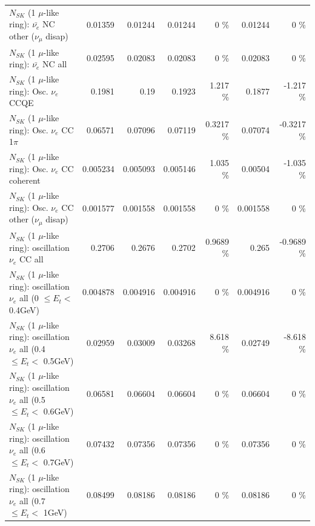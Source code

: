 \begin{table}
\begin{tabular}{| l | r | r | r  r | r  r |}
          $N_{SK}$ (1 $\mu$-like ring): $\bar{\nu_e}$ NC other ($\nu_\mu$ disap) &         0.01359 &         0.01244 &         0.01244 &        0 \%  &         0.01244 &        0 \%  \\ 
                            $N_{SK}$ (1 $\mu$-like ring): $\bar{\nu_{e}}$ NC all &         0.02595 &         0.02083 &         0.02083 &        0 \%  &         0.02083 &        0 \%  \\ 
\hline
\hline
\hline
                                 $N_{SK}$ (1 $\mu$-like ring): Osc. $\nu_e$ CCQE &          0.1981 &            0.19 &          0.1923 &    1.217 \%  &          0.1877 &   -1.217 \%  \\ 
                            $N_{SK}$ (1 $\mu$-like ring): Osc. $\nu_e$ CC 1$\pi$ &         0.06571 &         0.07096 &         0.07119 &   0.3217 \%  &         0.07074 &  -0.3217 \%  \\ 
                          $N_{SK}$ (1 $\mu$-like ring): Osc. $\nu_e$ CC coherent &        0.005234 &        0.005093 &        0.005146 &    1.035 \%  &         0.00504 &   -1.035 \%  \\ 
           $N_{SK}$ (1 $\mu$-like ring): Osc. $\nu_e$ CC other ($\nu_\mu$ disap) &        0.001577 &        0.001558 &        0.001558 &        0 \%  &        0.001558 &        0 \%  \\ 
                        $N_{SK}$ (1 $\mu$-like ring): oscillation $\nu_e$ CC all &          0.2706 &          0.2676 &          0.2702 &   0.9689 \%  &           0.265 &  -0.9689 \%  \\ 
\hline
$N_{SK}$ (1 $\mu$-like ring): oscillation $\nu_{e}$ all (0 $\leq E_{t} <$ 0.4GeV) &        0.004878 &        0.004916 &        0.004916 &        0 \%  &        0.004916 &        0 \%  \\ 
$N_{SK}$ (1 $\mu$-like ring): oscillation $\nu_{e}$ all (0.4 $\leq E_{t} <$ 0.5GeV) &         0.02959 &         0.03009 &         0.03268 &    8.618 \%  &         0.02749 &   -8.618 \%  \\ 
$N_{SK}$ (1 $\mu$-like ring): oscillation $\nu_{e}$ all (0.5 $\leq E_{t} <$ 0.6GeV) &         0.06581 &         0.06604 &         0.06604 &        0 \%  &         0.06604 &        0 \%  \\ 
$N_{SK}$ (1 $\mu$-like ring): oscillation $\nu_{e}$ all (0.6 $\leq E_{t} <$ 0.7GeV) &         0.07432 &         0.07356 &         0.07356 &        0 \%  &         0.07356 &        0 \%  \\ 
$N_{SK}$ (1 $\mu$-like ring): oscillation $\nu_{e}$ all (0.7 $\leq E_{t} <$ 1GeV) &         0.08499 &         0.08186 &         0.08186 &        0 \%  &         0.08186 &        0 \%  \\ 

\end{tabular}
\end{table}
